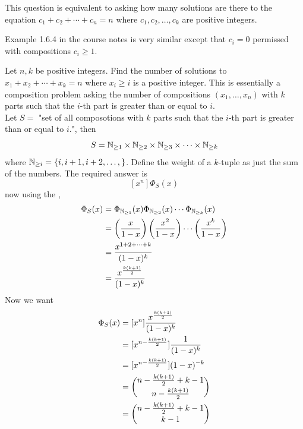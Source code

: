 \documentclass[english, 11pt]{article}
\begin{document}
   \begin{note}
     This question is equivalent to asking how many solutions are there to the equation $c_1 +c_2 + \cdots + c_n = n$ where $c_1, c_2, \ldots, c_k$ are positive integers.
   \end{note}

   \begin{note}
     Example 1.6.4 in the course notes is very similar except that $c_i = 0$ permissed with compositions $c_i \geq 1$.
   \end{note}

   \begin{exmp}
     Let $n, k$ be positive integers. Find the number of solutions to $x_1 + x_2 + \cdots + x_k = n$ where $x_i \geq i$ is a positive integer. This is essentially a composition problem asking the number of compositions $(x_1, \ldots, x_n)$ with $k$ parts such that the $i$-th part is greater than or equal to $i$. \\

     Let $S =$ "set of all composotions with $k$ parts such that the $i$-th part is greater than or equal to $i$.", then
     \[ S = {\mathbb{N}}_{\geq 1} \times {\mathbb{N}}_{\geq 2} \times {\mathbb{N}}_{\geq 3} \times \cdots \times {\mathbb{N}}_{\geq k} \]
     where ${\mathbb{N}}_{\geq i} = \{ i, i+1, i+2, \ldots, \}$. Define the weight of a $k$-tuple as just the sum of the numbers. The required answer is
     \[ [x^n]\Phi_S(x) \]
     now using the ,
     \begin{align*}
     \Phi_S(x) & = \Phi_{{\mathbb{N}}_{\geq 1}}(x)\Phi_{{\mathbb{N}}_{\geq 2}}(x)\cdots\Phi_{{\mathbb{N}}_{\geq k}}(x) \\
               & = \left( \frac{x}{1-x} \right) \left( \frac{x^2}{1-x} \right) \cdots \left( \frac{x^k}{1-x} \right) \\
               & = \frac{x^{1+2+\cdots+k}}{(1-x)^k} \\
               & = \frac{x^{\frac{k(k+1)}{2}}}{(1-x)^k}
     \end{align*}
     Now we want
     \begin{align*}
       [x^n] \Phi_S(x) & = [x^n] \f{x^{\f{k(k+1)}{2}}}{(1-x)^k} \\
       & = [x^{n-\f{k(k+1)}{2}}] \f{1}{(1-x)^k} \\
       & = [x^{n - \f{k(k+1)}{2} }] (1-x)^{-k} \\
       & = \comb{n - \f{k(k+1)}{2} + k - 1}{n - \f{k(k+1)}{2} } \\
       & = \comb{n - \f{k(k+1)}{2} + k - 1}{k - 1}
     \end{align*}
   \end{exmp}
\end{document}
